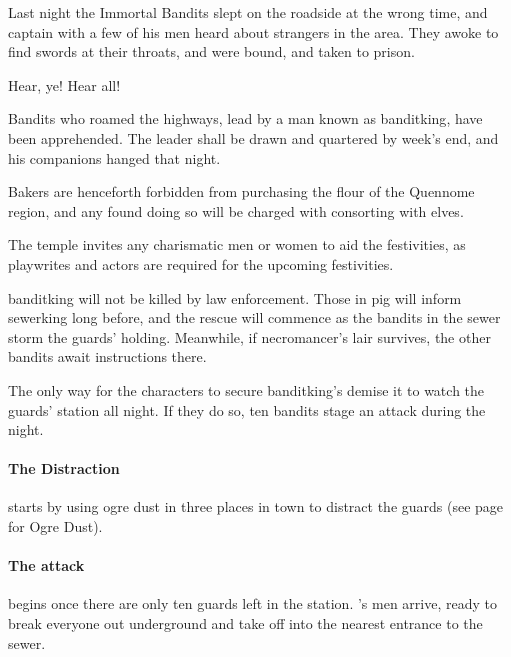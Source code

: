 \begin{multicols}{2}
\stopcontents[Town]

Last night the Immortal Bandits slept on the roadside at the wrong time, and \gls{captain} with a few of his men heard about strangers in the area.
They awoke to find swords at their throats, and were bound, and taken to prison.

\begin{boxtext}

  Hear, ye!  Hear all!

  Bandits who roamed the highways, lead by a man known as \gls{banditking}, have been apprehended.  The leader shall be drawn and quartered by week's end, and his companions hanged that night.

  Bakers are henceforth forbidden from purchasing the flour of the Quennome region, and any found doing so will be charged with consorting with elves.

  The temple invites any charismatic men or women to aid the festivities, as playwrites and actors are required for the upcoming festivities.

\end{boxtext}

\Gls{banditking} will not be killed by law enforcement.
Those in \gls{pig} will inform \gls{sewerking} long before, and the rescue will commence as the bandits in the sewer storm the guards' holding.
Meanwhile, if \gls{necromancer}'s lair survives, the other bandits await instructions there.

The only way for the characters to secure \gls{banditking}'s demise it to watch the guards' station all night.
If they do so, ten bandits stage an attack during the night.

\paragraph{The Distraction} starts by using ogre dust in three places in town to distract the guards (see page \pageref{ogredust} for Ogre Dust).

\paragraph{The attack}
begins once there are only ten guards left in the station.
's men arrive, ready to break everyone out underground and take off into the nearest entrance to the sewer.


\stopcontents[sq]

\stopcontents[Villages]

\end{multicols}

